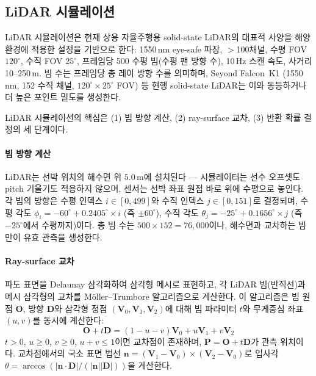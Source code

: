 \documentclass[11pt]{report}
\numberwithin{equation}{chapter}
\numberwithin{figure}{chapter}
\numberwithin{table}{chapter}
\begin{document}
\subsection{LiDAR 시뮬레이션}
\label{sec:lidar_sim}

LiDAR 시뮬레이션은 현재 상용 자율주행용 solid-state LiDAR의
대표적 사양을 해양 환경에 적용한 설정을 기반으로 한다:
1550\,nm eye-safe 파장, $>$100채널, 수평 FOV $120^\circ$,
수직 FOV $25^\circ$, 프레임당 500 수평 빔(수평 팬 방향 수), 10\,Hz 스캔 속도,
사거리 10--250\,m.
빔 수는 프레임당 총 레이 방향 수를 의미하며,
Seyond Falcon~K1 (1550\,nm, 152 수직 채널, $120^\circ \times 25^\circ$ FOV) 등
현행 solid-state LiDAR는 이와 동등하거나 더 높은 포인트 밀도를 생성한다.

LiDAR 시뮬레이션의 핵심은 (1) 빔 방향 계산, (2) ray-surface 교차,
(3) 반환 확률 결정의 세 단계이다.

\paragraph{빔 방향 계산}
LiDAR는 선박 위치의 해수면 위 $5.0$\,m에 설치된다 --- 시뮬레이터는 선수 오프셋도
pitch 기울기도 적용하지 않으며, 센서는 선박 좌표 원점 바로 위에 수평으로 놓인다.
각 빔의 방향은 수평 인덱스 $i \in [0, 499]$와 수직 인덱스 $j \in [0, 151]$로 결정되며,
수평 각도 $\phi_i = -60^\circ + 0.2405^\circ \times i$ (즉 $\pm 60^\circ$),
수직 각도 $\theta_j = -25^\circ + 0.1656^\circ \times j$ (즉 $-25^\circ$에서 수평까지)이다.
총 빔 수는 $500 \times 152 = 76{,}000$이나,
해수면과 교차하는 빔만이 유효 관측을 생성한다.

\paragraph{Ray-surface 교차}
파도 표면을 Delaunay 삼각화하여 삼각형 메시로 표현하고,
각 LiDAR 빔(반직선)과 메시 삼각형의 교차를
Möller--Trumbore 알고리즘으로 계산한다.
이 알고리즘은 빔 원점 $\mathbf{O}$, 방향 $\mathbf{D}$와
삼각형 정점 $(\mathbf{V}_0, \mathbf{V}_1, \mathbf{V}_2)$에 대해
빔 파라미터 $t$와 무게중심 좌표 $(u, v)$를 동시에 계산한다:
\begin{equation}
  \mathbf{O} + t\mathbf{D} = (1-u-v)\mathbf{V}_0 + u\mathbf{V}_1 + v\mathbf{V}_2
\end{equation}
$t > 0$, $u \geq 0$, $v \geq 0$, $u + v \leq 1$이면 교차점이 존재하며,
$\mathbf{P} = \mathbf{O} + t\mathbf{D}$가 관측 위치이다.
교차점에서의 국소 표면 법선
$\mathbf{n} = (\mathbf{V}_1 - \mathbf{V}_0) \times (\mathbf{V}_2 - \mathbf{V}_0)$로
입사각 $\theta = \arccos(|\mathbf{n} \cdot \mathbf{D}| / (|\mathbf{n}||\mathbf{D}|))$을
계산한다.
\end{document}
